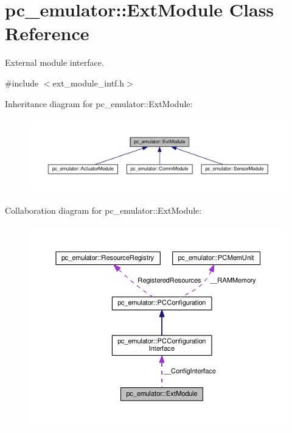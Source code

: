 \hypertarget{classpc__emulator_1_1ExtModule}{}\section{pc\+\_\+emulator\+:\+:Ext\+Module Class Reference}
\label{classpc__emulator_1_1ExtModule}


External module interface.  




{\ttfamily \#include $<$ext\+\_\+module\+\_\+intf.\+h$>$}



Inheritance diagram for pc\+\_\+emulator\+:\+:Ext\+Module\+:\nopagebreak
\begin{figure}[H]
\begin{center}
\leavevmode
\includegraphics[width=350pt]{classpc__emulator_1_1ExtModule__inherit__graph}
\end{center}
\end{figure}


Collaboration diagram for pc\+\_\+emulator\+:\+:Ext\+Module\+:\nopagebreak
\begin{figure}[H]
\begin{center}
\leavevmode
\includegraphics[width=350pt]{classpc__emulator_1_1ExtModule__coll__graph}
\end{center}
\end{figure}
